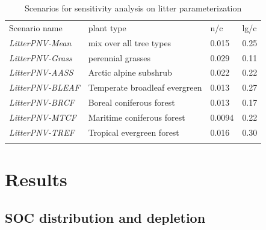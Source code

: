 \documentclass[gc, manuscript]{copernicus}
\begin{document}
 \begin{table}[h]
 \caption{Scenarios for sensitivity analysis on litter parameterization}
 \begin{tabular}{l l l l}
 \tophline
  Scenario name & plant type & n/c & lg/c \\
  \middlehline
  \textit{LitterPNV-Mean} & mix over all tree types & 0.015  & 0.25 \\
  \textit{LitterPNV-Grass} & perennial grasses     & 0.029  & 0.11 \\
  \textit{LitterPNV-AASS}  & Arctic alpine subshrub           & 0.022  & 0.22 \\
  \textit{LitterPNV-BLEAF} & Temperate broadleaf evergreen    & 0.013  & 0.27 \\
  \textit{LitterPNV-BRCF}  & Boreal coniferous forest         & 0.013  & 0.17 \\
  \textit{LitterPNV-MTCF}  & Maritime coniferous forest       & 0.0094 & 0.22 \\
  \textit{LitterPNV-TREF}  & Tropical evergreen forest        & 0.016  & 0.30 \\
 \bottomhline
 \end{tabular}
 \belowtable{}
 \label{tab:scenlitterpnv}
 \end{table}

\newpage

\hypertarget{results}{%
\section{Results}\label{results}}

\hypertarget{soc-distribution-and-depletion}{%
\subsection{SOC distribution and depletion}\label{soc-distribution-and-depletion}}
\end{document}

